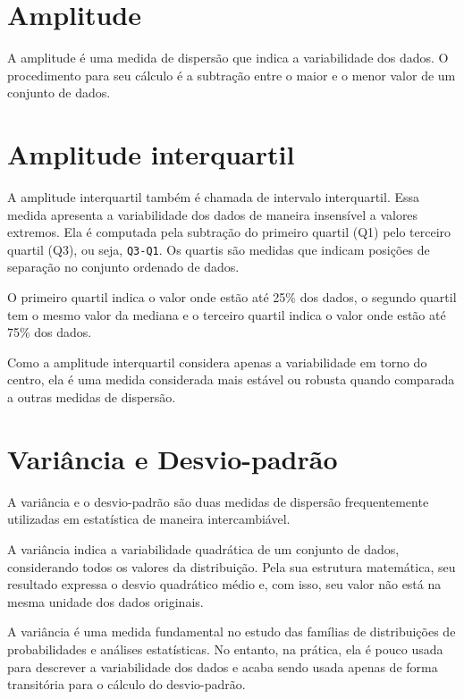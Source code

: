 \documentclass[
]{book}
\begin{document}
\hypertarget{amplitude}{%
\section{Amplitude}\label{amplitude}}

A amplitude é uma medida de dispersão que indica a variabilidade dos
dados. O procedimento para seu cálculo é a subtração entre o maior e o
menor valor de um conjunto de dados.

\hypertarget{amplitude-interquartil}{%
\section{Amplitude interquartil}\label{amplitude-interquartil}}

A amplitude interquartil também é chamada de intervalo interquartil.
Essa medida apresenta a variabilidade dos dados de maneira insensível a
valores extremos. Ela é computada pela subtração do primeiro quartil
(Q1) pelo terceiro quartil (Q3), ou seja, \texttt{Q3-Q1}. Os quartis são
medidas que indicam posições de separação no conjunto ordenado de dados.

O primeiro quartil indica o valor onde estão até 25\% dos dados, o
segundo quartil tem o mesmo valor da mediana e o terceiro quartil indica
o valor onde estão até 75\% dos dados.

Como a amplitude interquartil considera apenas a variabilidade em torno
do centro, ela é uma medida considerada mais estável ou robusta quando
comparada a outras medidas de dispersão.

\hypertarget{variuxe2ncia-e-desvio-padruxe3o}{%
\section{Variância e
Desvio-padrão}\label{variuxe2ncia-e-desvio-padruxe3o}}

A variância e o desvio-padrão são duas medidas de dispersão
frequentemente utilizadas em estatística de maneira intercambiável.

A variância indica a variabilidade quadrática de um conjunto de dados,
considerando todos os valores da distribuição. Pela sua estrutura
matemática, seu resultado expressa o desvio quadrático médio e, com
isso, seu valor não está na mesma unidade dos dados originais.

A variância é uma medida fundamental no estudo das famílias de
distribuições de probabilidades e análises estatísticas. No entanto, na
prática, ela é pouco usada para descrever a variabilidade dos dados e
acaba sendo usada apenas de forma transitória para o cálculo do
desvio-padrão.
\end{document}
